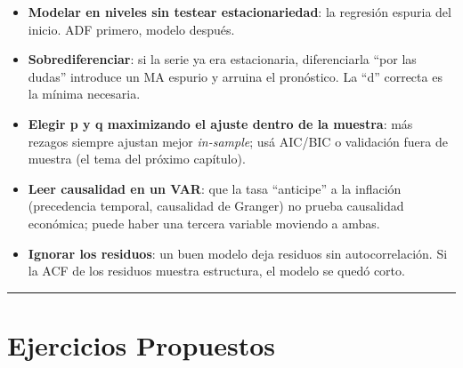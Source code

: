 \documentclass[
  spanish,
  letterpaper,
  DIV=11,
  numbers=noendperiod]{scrreprt}
\providecommand{\tightlist}{%
  \setlength{\itemsep}{0pt}\setlength{\parskip}{0pt}}
\begin{document}
\begin{tcolorbox}[enhanced jigsaw, bottomrule=.15mm, colback=white, opacitybacktitle=0.6, arc=.35mm, toprule=.15mm, opacityback=0, breakable, titlerule=0mm, left=2mm, coltitle=black, colbacktitle=quarto-callout-warning-color!10!white, colframe=quarto-callout-warning-color-frame, leftrule=.75mm, toptitle=1mm, bottomtitle=1mm, title=\textcolor{quarto-callout-warning-color}{\faExclamationTriangle}\hspace{0.5em}{Trampas frecuentes}, rightrule=.15mm]

\begin{itemize}
\tightlist
\item
  \textbf{Modelar en niveles sin testear estacionariedad}: la regresión
  espuria del inicio. ADF primero, modelo después.
\item
  \textbf{Sobrediferenciar}: si la serie ya era estacionaria,
  diferenciarla ``por las dudas'' introduce un MA espurio y arruina el
  pronóstico. La ``d'' correcta es la mínima necesaria.
\item
  \textbf{Elegir p y q maximizando el ajuste dentro de la muestra}: más
  rezagos siempre ajustan mejor \emph{in-sample}; usá AIC/BIC o
  validación fuera de muestra (el tema del próximo capítulo).
\item
  \textbf{Leer causalidad en un VAR}: que la tasa ``anticipe'' a la
  inflación (precedencia temporal, causalidad de Granger) no prueba
  causalidad económica; puede haber una tercera variable moviendo a
  ambas.
\item
  \textbf{Ignorar los residuos}: un buen modelo deja residuos sin
  autocorrelación. Si la ACF de los residuos muestra estructura, el
  modelo se quedó corto.
\end{itemize}

\end{tcolorbox}

\begin{center}\rule{0.5\linewidth}{0.5pt}\end{center}

\chapter{Ejercicios Propuestos}\label{ejercicios-propuestos-15}
\end{document}
